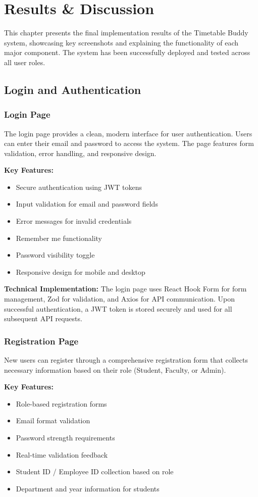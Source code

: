 \chapter{Results \& Discussion}

This chapter presents the final implementation results of the Timetable Buddy system, showcasing key screenshots and explaining the functionality of each major component. The system has been successfully deployed and tested across all user roles.

\section{Login and Authentication}

\subsection{Login Page}
The login page provides a clean, modern interface for user authentication. Users can enter their email and password to access the system. The page features form validation, error handling, and responsive design.

\textbf{Key Features:}
\begin{itemize}
    \item Secure authentication using JWT tokens
    \item Input validation for email and password fields
    \item Error messages for invalid credentials
    \item Remember me functionality
    \item Password visibility toggle
    \item Responsive design for mobile and desktop
\end{itemize}

\textbf{Technical Implementation:} The login page uses React Hook Form for form management, Zod for validation, and Axios for API communication. Upon successful authentication, a JWT token is stored securely and used for all subsequent API requests.

\subsection{Registration Page}
New users can register through a comprehensive registration form that collects necessary information based on their role (Student, Faculty, or Admin).

\textbf{Key Features:}
\begin{itemize}
    \item Role-based registration forms
    \item Email format validation
    \item Password strength requirements
    \item Real-time validation feedback
    \item Student ID / Employee ID collection based on role
    \item Department and year information for students
\end{itemize}

